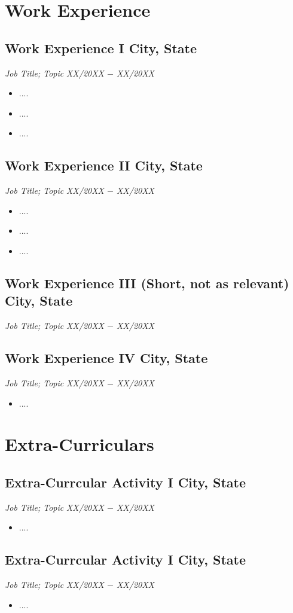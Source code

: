 \documentclass[10pt,letterpaper]{article}																			%
\newcommand{\NameDate}[2]{%
  \subsection[#1]{#1 \hfill #2}%
}
\newcommand{\myitem}{\item[\tiny$\blacksquare$]}
\begin{document}
 

\section{Work Experience}
\NameDate{Work Experience I}{City, State}
\textit{Job Title; Topic} \hfill \textit {XX/20XX $-$ XX/20XX} \\[-6.25mm]
\begin{itemize}
\setlength\itemsep{-0.35em}
\myitem ....
\myitem ....
\myitem ....
\end{itemize}

\NameDate{Work Experience II}{City, State}
\textit{Job Title; Topic} \hfill \textit {XX/20XX $-$ XX/20XX} \\[-6.25mm]
\begin{itemize}
\setlength\itemsep{-0.35em}
\myitem ....
\myitem ....
\myitem ....
\end{itemize}

\NameDate{Work Experience III (Short,  not as relevant)}{City, State}
\textit{Job Title; Topic} \hfill \textit {XX/20XX $-$ XX/20XX}  \\[-2.5mm] 									%


\NameDate{Work Experience IV}{City, State}
\textit{Job Title; Topic} \hfill \textit {XX/20XX $-$ XX/20XX} \\[-6.25mm]
\begin{itemize}
\setlength\itemsep{-0.35em}
\myitem ....
\end{itemize}


 

\section{Extra-Curriculars}
\NameDate{Extra-Currcular Activity I}{City, State}
\textit{Job Title; Topic} \hfill \textit {XX/20XX $-$ XX/20XX} \\[-6.25mm]
\begin{itemize}
\setlength\itemsep{-0.35em}
\myitem ....
\end{itemize}

\NameDate{Extra-Currcular Activity I}{City, State}
\textit{Job Title; Topic} \hfill \textit {XX/20XX $-$ XX/20XX} \\[-6.25mm]
\begin{itemize}
\setlength\itemsep{-0.35em}
\myitem ....
\end{itemize}
\end{document}
